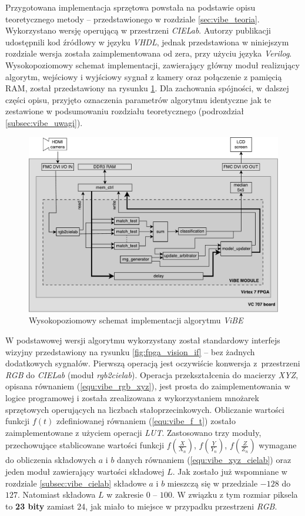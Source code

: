 Przygotowana implementacja sprzętowa powstała na podstawie opisu teoretycznego metody -- przedstawionego w rozdziale \ref{sec:vibe_teoria}. Wykorzystano wersję operującą w przestrzeni \textit{CIELab}. Autorzy publikacji \cite{kryjak_14_vibe} udostępnili kod źródłowy w języku \textit{VHDL}, jednak przedstawiona w niniejszym rozdziale wersja została zaimplementowana od zera, przy użyciu języka \textit{Verilog}.  
Wysokopoziomowy schemat implementacji, zawierający główny moduł realizujący algorytm, wejściowy i wyjściowy sygnał z kamery oraz połączenie z pamięcią RAM, został przedstawiony na rysunku \ref{fig:vibe_diagram}. 
Dla zachowania spójności, w dalszej części opisu, przyjęto oznaczenia parametrów algorytmu identyczne jak te zestawione w podsumowaniu rozdziału teoretycznego (podrozdział \ref{subsec:vibe_uwagi}).

	\begin{figure}[h!]
		\centering
		\includegraphics[scale=0.6]{img/4/vibe.pdf}
		\caption{Wysokopoziomowy schemat implementacji algorytmu \textit{ViBE}}
		\label{fig:vibe_diagram}
	\end{figure}

W podstawowej wersji algorytmu wykorzystany został standardowy interfejs wizyjny przedstawiony na rysunku \ref{fig:fpga_vision_if} -- bez żadnych dodatkowych sygnałów. 
Pierwszą operacją jest oczywiście konwersja z~przestrzeni \textit{RGB} do \textit{CIELab} (moduł \textit{rgb2cielab}). 
Operacja przekształcenia do macierzy \textit{XYZ}, opisana równaniem (\ref{equ:vibe_rgb_xyz}), jest prosta do zaimplementowania w logice programowej i została zrealizowana z wykorzystaniem mnożarek sprzętowych operujących na liczbach stałoprzecinkowych. 
Obliczanie wartości funkcji $f(t)$ zdefiniowanej równaniem (\ref{equ:vibe_f_t}) zostało zaimplementowane z użyciem operacji \textit{LUT}. 
Zastosowano trzy moduły, przechowujące stablicowane wartości funkcji $f(\frac{X}{X_n})$, $f(\frac{Y}{Y_n})$, $f(\frac{Z}{Z_n})$ wymagane do obliczenia składowych $a$ i $b$ danych równaniem (\ref{equ:vibe_xyz_cielab}) oraz jeden moduł zawierający wartości składowej $L$. 
Jak zostało już wspomniane w rozdziale \ref{subsec:vibe_cielab} składowe $a$ i $b$ mieszczą się w przedziale $-128$ do $127$. 
Natomiast składowa $L$ w zakresie $0$ -- $100$. 
W związku z tym rozmiar piksela to \textbf{23 bity} zamiast 24, jak miało to miejsce w przypadku przestrzeni \textit{RGB}.

